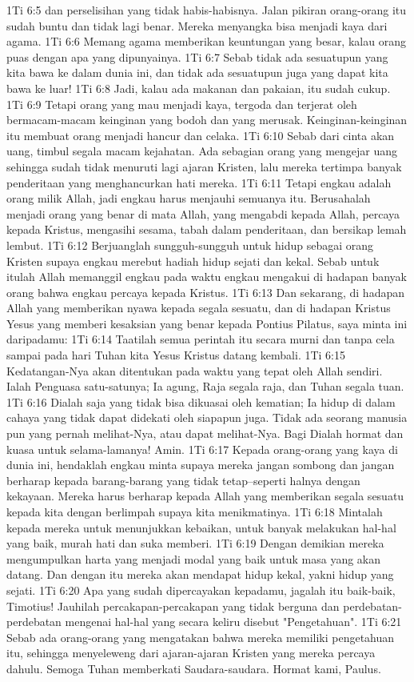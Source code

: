 1Ti 6:5  dan perselisihan yang tidak habis-habisnya. Jalan pikiran orang-orang itu sudah buntu dan tidak lagi benar. Mereka menyangka bisa menjadi kaya dari agama.
1Ti 6:6  Memang agama memberikan keuntungan yang besar, kalau orang puas dengan apa yang dipunyainya.
1Ti 6:7  Sebab tidak ada sesuatupun yang kita bawa ke dalam dunia ini, dan tidak ada sesuatupun juga yang dapat kita bawa ke luar!
1Ti 6:8  Jadi, kalau ada makanan dan pakaian, itu sudah cukup.
1Ti 6:9  Tetapi orang yang mau menjadi kaya, tergoda dan terjerat oleh bermacam-macam keinginan yang bodoh dan yang merusak. Keinginan-keinginan itu membuat orang menjadi hancur dan celaka.
1Ti 6:10  Sebab dari cinta akan uang, timbul segala macam kejahatan. Ada sebagian orang yang mengejar uang sehingga sudah tidak menuruti lagi ajaran Kristen, lalu mereka tertimpa banyak penderitaan yang menghancurkan hati mereka.
1Ti 6:11  Tetapi engkau adalah orang milik Allah, jadi engkau harus menjauhi semuanya itu. Berusahalah menjadi orang yang benar di mata Allah, yang mengabdi kepada Allah, percaya kepada Kristus, mengasihi sesama, tabah dalam penderitaan, dan bersikap lemah lembut.
1Ti 6:12  Berjuanglah sungguh-sungguh untuk hidup sebagai orang Kristen supaya engkau merebut hadiah hidup sejati dan kekal. Sebab untuk itulah Allah memanggil engkau pada waktu engkau mengakui di hadapan banyak orang bahwa engkau percaya kepada Kristus.
1Ti 6:13  Dan sekarang, di hadapan Allah yang memberikan nyawa kepada segala sesuatu, dan di hadapan Kristus Yesus yang memberi kesaksian yang benar kepada Pontius Pilatus, saya minta ini daripadamu:
1Ti 6:14  Taatilah semua perintah itu secara murni dan tanpa cela sampai pada hari Tuhan kita Yesus Kristus datang kembali.
1Ti 6:15  Kedatangan-Nya akan ditentukan pada waktu yang tepat oleh Allah sendiri. Ialah Penguasa satu-satunya; Ia agung, Raja segala raja, dan Tuhan segala tuan.
1Ti 6:16  Dialah saja yang tidak bisa dikuasai oleh kematian; Ia hidup di dalam cahaya yang tidak dapat didekati oleh siapapun juga. Tidak ada seorang manusia pun yang pernah melihat-Nya, atau dapat melihat-Nya. Bagi Dialah hormat dan kuasa untuk selama-lamanya! Amin.
1Ti 6:17  Kepada orang-orang yang kaya di dunia ini, hendaklah engkau minta supaya mereka jangan sombong dan jangan berharap kepada barang-barang yang tidak tetap--seperti halnya dengan kekayaan. Mereka harus berharap kepada Allah yang memberikan segala sesuatu kepada kita dengan berlimpah supaya kita menikmatinya.
1Ti 6:18  Mintalah kepada mereka untuk menunjukkan kebaikan, untuk banyak melakukan hal-hal yang baik, murah hati dan suka memberi.
1Ti 6:19  Dengan demikian mereka mengumpulkan harta yang menjadi modal yang baik untuk masa yang akan datang. Dan dengan itu mereka akan mendapat hidup kekal, yakni hidup yang sejati.
1Ti 6:20  Apa yang sudah dipercayakan kepadamu, jagalah itu baik-baik, Timotius! Jauhilah percakapan-percakapan yang tidak berguna dan perdebatan-perdebatan mengenai hal-hal yang secara keliru disebut "Pengetahuan".
1Ti 6:21  Sebab ada orang-orang yang mengatakan bahwa mereka memiliki pengetahuan itu, sehingga menyeleweng dari ajaran-ajaran Kristen yang mereka percaya dahulu. Semoga Tuhan memberkati Saudara-saudara. Hormat kami, Paulus.



